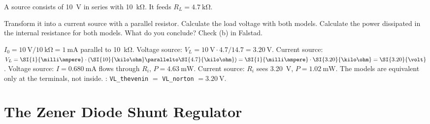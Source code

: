 A source consists of \SI{10}{\volt} in series with \SI{10}{\kilo\ohm}. It feeds $R_L = \SI{4.7}{\kilo\ohm}$.
\begin{talist}
\ta Transform it into a current source with a parallel resistor.
\ta Calculate the load voltage with both models.
\ta Calculate the power dissipated in the internal resistance for both models. What do you conclude?
\ta Check (b) in Falstad.
\end{talist}

\begin{solution}
\begin{talist}
\ta $I_0 = \SI{10}{\volt}/\SI{10}{\kilo\ohm} = \SI{1}{\milli\ampere}$ parallel to \SI{10}{\kilo\ohm}.
\ta Voltage source: $V_L = \SI{10}{\volt}\cdot 4.7/14.7 = \SI{3.20}{\volt}$.
    Current source: $V_L = \SI{1}{\milli\ampere}\cdot(\SI{10}{\kilo\ohm}\parallelto\SI{4.7}{\kilo\ohm}) = \SI{1}{\milli\ampere}\cdot\SI{3.20}{\kilo\ohm} = \SI{3.20}{\volt}$.
\ta Voltage source: $I = \SI{0.680}{\milli\ampere}$ flows through $R_i$, $P = \SI{4.63}{\milli\watt}$.
    Current source: $R_i$ sees \SI{3.20}{\volt}, $P = \SI{1.02}{\milli\watt}$.
    The models are equivalent only at the terminals, not inside.
\ta {}: \texttt{VL\_thevenin} $=$ \texttt{VL\_norton} $=\SI{3.20}{\volt}$.
\end{talist}
\end{solution}

\section{The Zener Diode Shunt Regulator}

